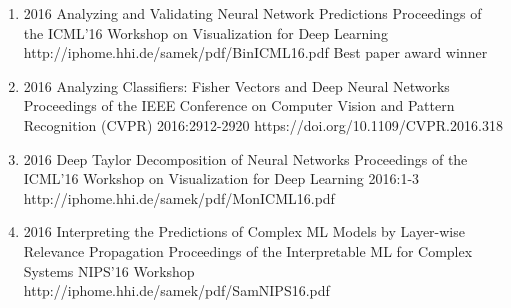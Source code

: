 \documentclass[10pt,a4paper]{article} %
\begin{document}
{\begin{enumerate}
        \item {}
                                {2016}
                                {Analyzing and Validating Neural Network Predictions}
                                {Proceedings of the ICML'16 Workshop on Visualization for Deep Learning}
                                {}
                                {http://iphome.hhi.de/samek/pdf/BinICML16.pdf}
                                {Best paper award winner}

        \item {}
                                {2016}
                                {Analyzing Classifiers: Fisher Vectors and Deep Neural Networks}
                                {Proceedings of the IEEE Conference on Computer Vision and Pattern Recognition (CVPR)}
                                {2016:2912-2920}
                                {https://doi.org/10.1109/CVPR.2016.318}

        \item {}
                                {2016}
                                {Deep Taylor Decomposition of Neural Networks}
                                {Proceedings of the ICML'16 Workshop on Visualization for Deep Learning}
                                {2016:1-3}
                                {http://iphome.hhi.de/samek/pdf/MonICML16.pdf}

        \item {}
                                {2016}
                                {Interpreting the Predictions of Complex ML Models by Layer-wise Relevance Propagation}
                                {Proceedings of the Interpretable ML for Complex Systems NIPS'16 Workshop}
                                {}
                                {http://iphome.hhi.de/samek/pdf/SamNIPS16.pdf}

    \end{enumerate}
}
\end{document}

